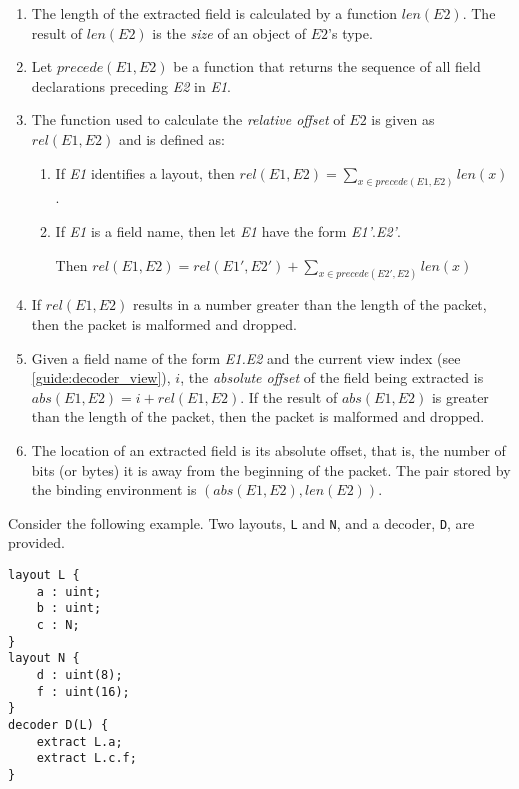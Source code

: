 \begin{enumerate}
\item The length of the extracted field is calculated by a function $len(E2)$. The result of $len(E2)$ is the \textit{size} of an object of $E2$'s type.

\item  Let $precede(E1, E2)$ be a function that returns the sequence of all field declarations preceding \textit{E2} in \textit{E1}.

\item The function used to calculate the \textit{relative offset} of $E2$ is given as $rel(E1, E2)$ and is defined as:

\begin{enumerate}

\item If \textit{E1} identifies a layout, then $rel(E1, E2) = \sum_{x \in precede(E1,E2)}{} len(x)$.

\item If \textit{E1} is a field name, then let \textit{E1} have the form \textit{E1'}.\textit{E2'}.

Then $rel(E1, E2)=rel(E1', E2') + \sum_{x \in precede(E2',E2)}{} len(x)$

\end{enumerate}

\item If $rel(E1, E2)$ results in a number greater than the length of the packet, then the packet is malformed and dropped.

\item Given a field name of the form \textit{E1.E2} and the current view index (see \ref{guide:decoder_view}), $i$, the \textit{absolute offset} of the field being extracted is $abs(E1, E2) = i + rel(E1, E2)$.
If the result of $abs(E1, E2)$ is greater than the length of the packet, then the packet is malformed and dropped.

\item The location of an extracted field is its absolute offset, that is, the number of bits (or bytes) it is away from the beginning of the packet. The pair stored by the binding environment is $(abs(E1, E2), len(E2))$.

\end{enumerate}

Consider the following example. Two layouts, \texttt{L} and \texttt{N}, and a decoder, \texttt{D}, are provided.

\begin{lstlisting}
layout L {
	a : uint;
	b : uint;
	c : N;
}
layout N {
	d : uint(8);
	f : uint(16);
}
decoder D(L) {
	extract L.a;
	extract L.c.f;
}
\end{lstlisting}

